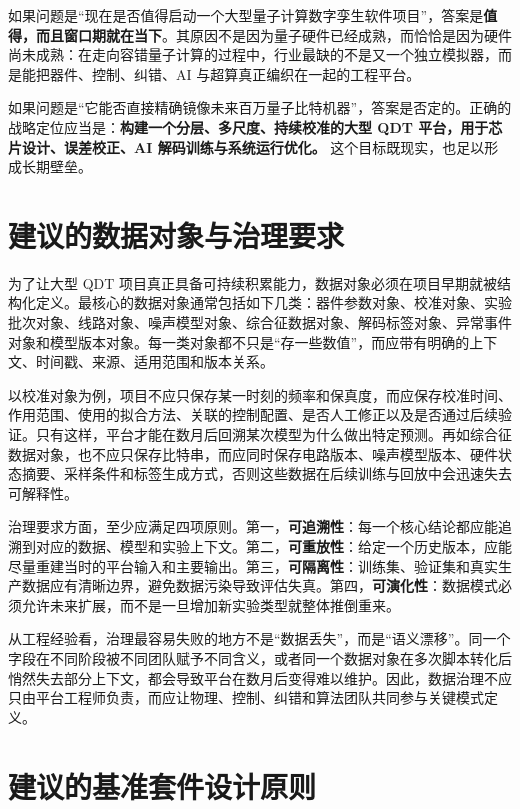 \documentclass[11pt,a4paper]{article}
\newcommand{\QDT}{QDT}
\begin{document}
如果问题是“现在是否值得启动一个大型量子计算数字孪生软件项目”，答案是\textbf{值得，而且窗口期就在当下}。其原因不是因为量子硬件已经成熟，而恰恰是因为硬件尚未成熟：在走向容错量子计算的过程中，行业最缺的不是又一个独立模拟器，而是能把器件、控制、纠错、AI 与超算真正编织在一起的工程平台。

如果问题是“它能否直接精确镜像未来百万量子比特机器”，答案是否定的。正确的战略定位应当是：\textbf{构建一个分层、多尺度、持续校准的大型 \QDT{} 平台，用于芯片设计、误差校正、AI 解码训练与系统运行优化。} 这个目标既现实，也足以形成长期壁垒。

\appendix
\section{建议的数据对象与治理要求}

为了让大型 \QDT{} 项目真正具备可持续积累能力，数据对象必须在项目早期就被结构化定义。最核心的数据对象通常包括如下几类：器件参数对象、校准对象、实验批次对象、线路对象、噪声模型对象、综合征数据对象、解码标签对象、异常事件对象和模型版本对象。每一类对象都不只是“存一些数值”，而应带有明确的上下文、时间戳、来源、适用范围和版本关系。

以校准对象为例，项目不应只保存某一时刻的频率和保真度，而应保存校准时间、作用范围、使用的拟合方法、关联的控制配置、是否人工修正以及是否通过后续验证。只有这样，平台才能在数月后回溯某次模型为什么做出特定预测。再如综合征数据对象，也不应只保存比特串，而应同时保存电路版本、噪声模型版本、硬件状态摘要、采样条件和标签生成方式，否则这些数据在后续训练与回放中会迅速失去可解释性。

治理要求方面，至少应满足四项原则。第一，\textbf{可追溯性}：每一个核心结论都应能追溯到对应的数据、模型和实验上下文。第二，\textbf{可重放性}：给定一个历史版本，应能尽量重建当时的平台输入和主要输出。第三，\textbf{可隔离性}：训练集、验证集和真实生产数据应有清晰边界，避免数据污染导致评估失真。第四，\textbf{可演化性}：数据模式必须允许未来扩展，而不是一旦增加新实验类型就整体推倒重来。

从工程经验看，治理最容易失败的地方不是“数据丢失”，而是“语义漂移”。同一个字段在不同阶段被不同团队赋予不同含义，或者同一个数据对象在多次脚本转化后悄然失去部分上下文，都会导致平台在数月后变得难以维护。因此，数据治理不应只由平台工程师负责，而应让物理、控制、纠错和算法团队共同参与关键模式定义。

\section{建议的基准套件设计原则}
\end{document}
